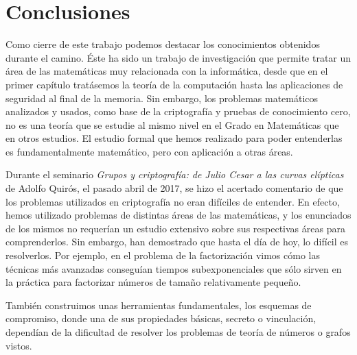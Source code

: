 










\clearpage

\section*{Conclusiones}

Como cierre de este trabajo podemos destacar los conocimientos obtenidos durante el camino. Éste ha sido un trabajo de investigación que permite tratar un área de las matemáticas muy relacionada con la informática, desde que en el primer capítulo tratásemos la teoría de la computación hasta las aplicaciones de seguridad al final de la memoria. Sin embargo, los problemas matemáticos analizados y usados, como base de la criptografía y pruebas de conocimiento cero, no es una teoría que se estudie al mismo nivel en el Grado en Matemáticas que en otros estudios. El estudio formal que hemos realizado para poder entenderlas es fundamentalmente matemático, pero con aplicación a otras áreas.
 
 
Durante el seminario \textit{Grupos y criptograf\'ia: de Julio Cesar a las curvas el\'ipticas} de Adolfo Quirós, el pasado abril de 2017, se hizo el acertado comentario de que los problemas utilizados en criptografía no eran difíciles de entender. En efecto, hemos utilizado problemas de distintas áreas de las matemáticas, y los enunciados de los mismos no requerían un estudio extensivo sobre sus respectivas áreas para comprenderlos. Sin embargo, han demostrado que hasta el día de hoy, lo difícil es resolverlos. Por ejemplo, en el problema de la factorización vimos cómo las técnicas más avanzadas conseguían tiempos subexponenciales que sólo sirven en la práctica para factorizar números de tamaño relativamente pequeño.

También construimos unas herramientas fundamentales, los esquemas de compromiso, donde una de sus propiedades básicas, secreto o vinculación, dependían de la dificultad de resolver los problemas de teoría de números o grafos vistos.

